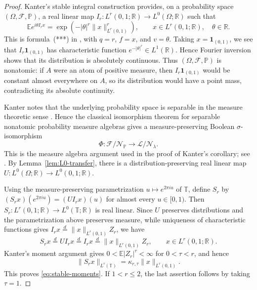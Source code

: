 \documentclass[10pt,a4paper]{amsart}
\newcommand{\T}{\mathbb{T}}
\newcommand{\R}{\mathbb{R}}
\begin{document}
\begin{proof}
Kanter's stable integral construction
\cite[Sections~4--5, pp.~405--406]{Kanter1973}
provides, on a probability space
\((\Omega,\mathcal F,\mathbb P)\), a real linear map
\(I_r:L^r(0,1;\R)\to L^0(\Omega;\R)\) such that
\[
        \mathbb E e^{i\theta I_rx}
        =
        \exp\left(
        -|\theta|^r\|x\|_{L^r(0,1)}^r
        \right),
        \qquad
        x\in L^r(0,1;\R),\quad \theta\in\R.
\]
This is formula~\textup{(***)} in
\cite[p.~406]{Kanter1973}, with \(q=r\), \(f=x\), and \(v=\theta\).
Taking \(x=\mathbf1_{(0,1)}\), we see that
\(I_r\mathbf1_{(0,1)}\) has characteristic function
\(e^{-|\theta|^r}\in L^1(\R)\). Hence Fourier inversion shows that
its distribution is absolutely continuous. Thus
\((\Omega,\mathcal F,\mathbb P)\) is nonatomic: if \(A\) were an
atom of positive measure, then \(I_r\mathbf1_{(0,1)}\) would be
constant almost everywhere on \(A\), so its distribution would have
a point mass, contradicting its absolute continuity.

Kanter notes that the underlying probability space is separable in
the measure theoretic sense \cite[p.~405]{Kanter1973}. Hence the
classical isomorphism theorem for separable nonatomic probability
measure algebras
\cite[Section~41, Theorem~C, p.~173]{Halmos1974} gives a
measure-preserving Boolean \(\sigma\)-isomorphism
\[
        \Phi:
        \mathcal F/\mathcal N_{\mathbb P}
        \longrightarrow
        \mathcal L/\mathcal N_\lambda.
\]
This is the measure algebra argument used in the proof of Kanter's
corollary; see \cite[p.~407]{Kanter1973}. By
Lemma~\ref{lem:L0-transfer}, there is a distribution-preserving real
linear map \(U:L^0(\Omega;\R)\to L^0(0,1;\R)\).

Using the measure-preserving parametrization
\(u\mapsto e^{2\pi iu}\) of \(\T\), define \(S_r\) by
\((S_rx)(e^{2\pi iu})=(UI_rx)(u)\) for almost every
\(u\in[0,1)\). Then
\(S_r:L^r(0,1;\R)\to L^0(\T;\R)\) is real linear.
Since \(U\) preserves distributions and the parametrization above
preserves measure, while uniqueness of characteristic functions gives
\(I_rx\overset{d}{=}\|x\|_{L^r(0,1)}Z_r\), we have
\[
        S_rx
        \overset{d}{=}
        UI_rx
        \overset{d}{=}
        I_rx
        \overset{d}{=}
        \|x\|_{L^r(0,1)}Z_r,
        \qquad
        x\in L^r(0,1;\R).
\]Kanter's moment argument
\cite[pp.~406--407]{Kanter1973} gives
\(0<\mathbb E|Z_r|^\tau<\infty\) for \(0<\tau<r\), and hence
\[
        \|S_rx\|_{L^\tau(\T)}
        =
        \kappa_{r,\tau}\|x\|_{L^r(0,1)}.
\]
This proves \eqref{eq:stable-moments}. If \(1<r\le2\), the last
assertion follows by taking \(\tau=1\).
\end{proof}
\end{document}
